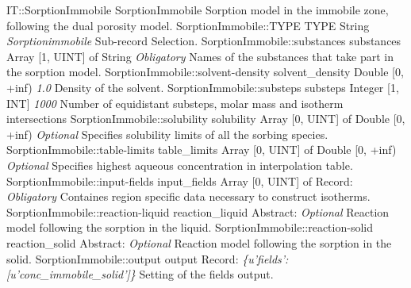 \begin{RecordType}
	{IT::SorptionImmobile}
	{SorptionImmobile}
	{} %
	{} %
	{{{Sorption model in the immobile zone, following the dual porosity model.}}}
		\RecKey
			{SorptionImmobile::TYPE}
			{TYPE}
			{{String}}
			{ \it{Sorptionimmobile} }
			{{{Sub-record Selection.}}}
		\RecKey
			{SorptionImmobile::substances}
			{substances}
			{{Array [1, UINT] of }{String}}
			{ \it{Obligatory} }
			{{{Names of the substances that take part in the sorption model.}}}
		\RecKey
			{SorptionImmobile::solvent-density}
			{solvent{\_}density}
			{{Double [0, +inf)}}
			{ \it{1.0} }
			{{{Density of the solvent.}}}
		\RecKey
			{SorptionImmobile::substeps}
			{substeps}
			{{Integer [1, INT]}}
			{ \it{1000} }
			{{{Number of equidistant substeps, molar mass and isotherm intersections}}}
		\RecKey
			{SorptionImmobile::solubility}
			{solubility}
			{{Array [0, UINT] of }{Double [0, +inf)}}
			{ \it{Optional} }
			{{{Specifies solubility limits of all the sorbing species.}}}
		\RecKey
			{SorptionImmobile::table-limits}
			{table{\_}limits}
			{{Array [0, UINT] of }{Double [0, +inf)}}
			{ \it{Optional} }
			{{{Specifies highest aqueous concentration in interpolation table.}}}
		\RecKey
			{SorptionImmobile::input-fields}
			{input{\_}fields}
			{{Array [0, UINT] of }{Record}{: }}
			{ \it{Obligatory} }
			{{{Containes region specific data necessary to construct isotherms.}}}
		\RecKey
			{SorptionImmobile::reaction-liquid}
			{reaction{\_}liquid}
			{{Abstract}{: }}
			{ \it{Optional} }
			{{{Reaction model following the sorption in the liquid.}}}
		\RecKey
			{SorptionImmobile::reaction-solid}
			{reaction{\_}solid}
			{{Abstract}{: }}
			{ \it{Optional} }
			{{{Reaction model following the sorption in the solid.}}}
		\RecKey
			{SorptionImmobile::output}
			{output}
			{{Record}{: }}
			{ \it{{\{}u'fields': [u'conc{\_}immobile{\_}solid']{\}}} }
			{{{Setting of the fields output.}}}
\end{RecordType}
